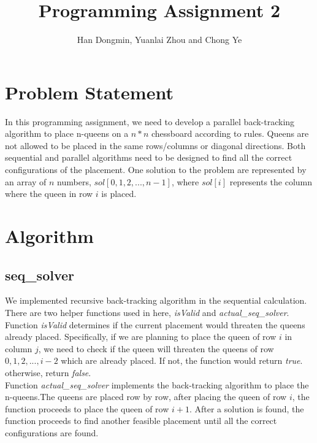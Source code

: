 \documentclass[twoside,12pt]{article}
\title{Programming Assignment 2}
\author{Han Dongmin, Yuanlai Zhou and Chong Ye}
\begin{document}
\maketitle
\section{Problem Statement}
In this programming assignment, we need to develop a parallel back-tracking algorithm to place n-queens on a $ n * n $ chessboard according to rules. Queens are not allowed to be placed in the same rows/columns or diagonal directions. Both sequential and parallel algorithms need to be designed to find all the correct configurations of the placement. One solution to the problem are represented by an array of $ n $ numbers, $ sol[0,1,2,...,n-1] $, where $ sol[i] $ represents the column where the queen in row $ i $ is placed.
\section{Algorithm}


\subsection{seq\_solver}
We implemented recursive back-tracking algorithm in the sequential calculation. There are two helper functions used in here, \textit{isValid} and \textit{actual\_seq\_solver}.\\
Function \textit{isValid} determines if the current placement would threaten the queens already placed. Specifically, if we are planning to place the queen of row $ i $ in column $ j $, we need to check if the queen will threaten the queens of row $ 0,1,2,...,i-2 $ which are already placed. If not, the function would return \textit{true}. otherwise, return \textit{false}. \\
Function \textit{actual\_seq\_solver} implements the back-tracking algorithm to place the n-queens.The queens are placed row by row, after placing the queen of row $ i $, the function proceeds to place the queen of row $ i+1 $. After a solution is found, the function proceeds to find another feasible placement until all the correct configurations are found. 
\end{document}
